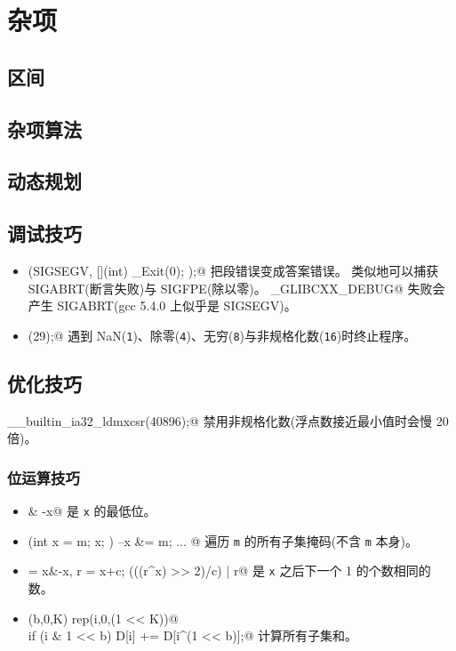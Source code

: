 \chapter{杂项}

\section{区间}

\section{杂项算法}

\section{动态规划}

\section{调试技巧}
	\begin{itemize}
		\item \verb@signal(SIGSEGV, [](int) { _Exit(0); });@ 把段错误变成答案错误。
			类似地可以捕获 SIGABRT(断言失败)与 SIGFPE(除以零)。
			\verb@_GLIBCXX_DEBUG@ 失败会产生 SIGABRT(gcc 5.4.0 上似乎是 SIGSEGV)。
		\item \verb@feenableexcept(29);@ 遇到 NaN(\texttt 1)、除零(\texttt 4)、无穷(\texttt 8)与非规格化数(\texttt{16})时终止程序。
	\end{itemize}

\section{优化技巧}
	\verb@__builtin_ia32_ldmxcsr(40896);@ 禁用非规格化数(浮点数接近最小值时会慢 20 倍)。
	\subsection{位运算技巧}
		\begin{itemize}
			\item \verb@x & -x@ 是 \texttt{x} 的最低位。
			\item \verb@for (int x = m; x; ) { --x &= m; ... }@ 遍历 \texttt{m} 的所有子集掩码(不含 \texttt{m} 本身)。
			\item \verb@c = x&-x, r = x+c; (((r^x) >> 2)/c) | r@ 是 \texttt{x} 之后下一个 1 的个数相同的数。
			\item \verb@rep(b,0,K) rep(i,0,(1 << K))@ \\ \verb@  if (i & 1 << b) D[i] += D[i^(1 << b)];@ 计算所有子集和。
		\end{itemize}
